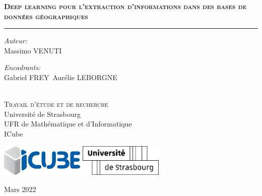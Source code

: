 \begin{titlepage}
  \doublespacing
  \large
  \hfill
  \vfill
  \vspace*{0.5cm}
  \begin{center}
    \doublespacing
    {\huge\textbf{\textsc{Deep learning pour l’extraction d’informations dans des bases de données géographiques}}}
  \end{center}
  \vspace{1.25cm}
  \hrule
  \vspace{1.5cm}
  \onehalfspacing
  \begin{center}

    \begin{minipage}[t]{0.5\textwidth}
      \begin{flushleft}
        \emph{Auteur:}\\
        Massimo \textsc{VENUTI}
      \end{flushleft}
    \end{minipage}
    \begin{minipage}[t]{0.4\textwidth}
      \begin{flushright}
        \emph{Encadrants:} \\
        Gabriel \textsc{FREY}\
        Aurélie \textsc{LEBORGNE}\\
      \end{flushright}
    \end{minipage}\\[1.5cm]

    {\LARGE{\textsc{Travail d'étude et de recherche}}}\\[1cm]

    Université de Strasbourg\\
    UFR de Mathématique et d’Informatique\\
    ICube

    \hfill
    \vfill


    \begin{center}
        \includegraphics[width=4cm]{images/icube}
        \hspace{2em}
        \includegraphics[width=4cm]{images/unistra}
    \end{center}

    \hfill
    \vfill

    Mars 2022
  \end{center}
\end{titlepage}
